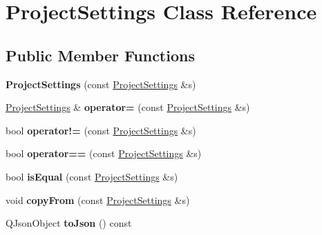 \hypertarget{class_project_settings}{\section{Project\-Settings Class Reference}
\label{class_project_settings}
}
\subsection*{Public Member Functions}
\begin{DoxyCompactItemize}
\item 
\hypertarget{class_project_settings_a644b2e3286f4a608e21a7ac709645b0f}{{\bfseries Project\-Settings} (const \hyperlink{class_project_settings}{Project\-Settings} \&s)}\label{class_project_settings_a644b2e3286f4a608e21a7ac709645b0f}

\item 
\hypertarget{class_project_settings_a2cde9bee2877203a127b41ae8f745249}{\hyperlink{class_project_settings}{Project\-Settings} \& {\bfseries operator=} (const \hyperlink{class_project_settings}{Project\-Settings} \&s)}\label{class_project_settings_a2cde9bee2877203a127b41ae8f745249}

\item 
\hypertarget{class_project_settings_a52c1a6cf55eba24475dd98b5ceb3391c}{bool {\bfseries operator!=} (const \hyperlink{class_project_settings}{Project\-Settings} \&s)}\label{class_project_settings_a52c1a6cf55eba24475dd98b5ceb3391c}

\item 
\hypertarget{class_project_settings_a5bd776c01b2c99a968cd9a3800dd292e}{bool {\bfseries operator==} (const \hyperlink{class_project_settings}{Project\-Settings} \&s)}\label{class_project_settings_a5bd776c01b2c99a968cd9a3800dd292e}

\item 
\hypertarget{class_project_settings_a5607894ba26a22c6ad6bb5ba506ba729}{bool {\bfseries is\-Equal} (const \hyperlink{class_project_settings}{Project\-Settings} \&s)}\label{class_project_settings_a5607894ba26a22c6ad6bb5ba506ba729}

\item 
\hypertarget{class_project_settings_ad154feb77afcb909bb45521bf1f0cbcb}{void {\bfseries copy\-From} (const \hyperlink{class_project_settings}{Project\-Settings} \&s)}\label{class_project_settings_ad154feb77afcb909bb45521bf1f0cbcb}

\item 
\hypertarget{class_project_settings_a19b7e255586f9c6d72d9daf4b2fd9382}{Q\-Json\-Object {\bfseries to\-Json} () const }\label{class_project_settings_a19b7e255586f9c6d72d9daf4b2fd9382}

\end{DoxyCompactItemize}
